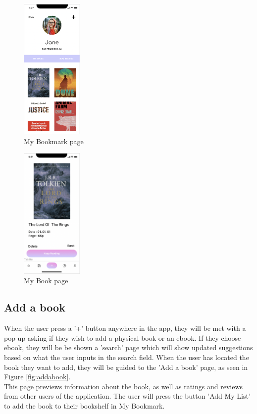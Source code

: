 \documentclass[conference]{IEEEtran}
\begin{document}
\begin{figure}[h]
    \centering
    \includegraphics[width=3cm]{Resources/Specifications/mybookmark.png}
    \caption{My Bookmark page}
    \label{fig:mybookmark}
\end{figure}

\begin{figure}[h]
    \centering
    \includegraphics[width=3cm]{Resources/Specifications/book.png}
    \caption{My Book page}
    \label{fig:book}
\end{figure}

\subsection{Add a book}
When the user press a '+' button anywhere in the app, they will be met with a pop-up asking if they wish to add a physical book or an ebook. If they choose ebook, they will be be shown a 'search' page which will show updated suggestions based on what the user inputs in the search field. When the user has located the book they want to add, they will be guided to the 'Add a book' page, as seen in Figure \ref{fig:addabook}. \\
This page previews information about the book, as well as ratings and reviews from other users of the application. The user will press the button 'Add My List' to add the book to their bookshelf in My Bookmark.\\
\end{document}
